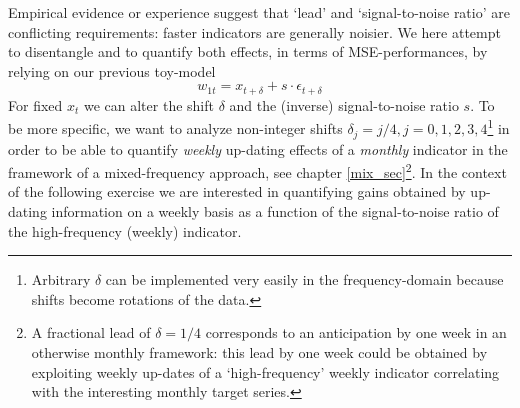 \documentclass[a4paper]{book}
\begin{document}
Empirical evidence or experience suggest that `lead' and `signal-to-noise ratio' are conflicting requirements: faster indicators are generally noisier. We here attempt to disentangle and to quantify both effects, in terms of MSE-performances, by relying on our previous toy-model
\[w_{1t}=x_{t+\delta}+s\cdot\epsilon_{t+\delta}\]
For fixed $x_t$ we can alter the shift $\delta$ and the (inverse) signal-to-noise ratio $s$. To be more specific, we want to analyze non-integer shifts $\delta_j=j/4,j=0,1,2,3,4$\footnote{Arbitrary $\delta$ can be implemented very easily in the frequency-domain because shifts become rotations of the data.} in order to be able to quantify \emph{weekly} up-dating effects of a \emph{monthly} indicator in the framework of a mixed-frequency approach, see chapter \ref{mix_sec}\footnote{A fractional lead of $\delta=1/4$ corresponds to an anticipation by one week in an otherwise monthly framework: this lead by one week could be obtained by exploiting weekly up-dates of a `high-frequency' weekly indicator correlating with the interesting monthly target series.}. In the context of the following exercise we are interested in quantifying gains obtained by up-dating information on a weekly basis as a function of the signal-to-noise ratio of the high-frequency (weekly) indicator.
\end{document}
